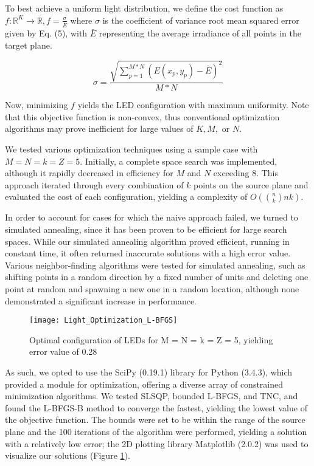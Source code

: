 \documentclass[a4paper]{article}
\begin{document}
To best achieve a uniform light distribution, we define the cost function as $f: \mathbb{R}^K \rightarrow \mathbb{R}, f = \frac{\sigma}{\bar{E}}$ where $\sigma$ is the coefficient of variance root mean squared error given by Eq. (5), with $\bar{E}$ representing the average irradiance of all points in the target plane.  


\begin{equation}
\sigma = \frac{\sqrt{\sum\limits_{p=1}^{M*N}(E(x_p, y_p) - \bar{E})^2}}{M*N}
\end{equation}


Now, minimizing $f$ yields the LED configuration with maximum uniformity. Note that this objective function is non-convex, thus conventional optimization algorithms may prove inefficient for large values of $K, M,$ or $N$.

We tested various optimization techniques using a sample case with $M = N = k = Z = 5$. Initially, a complete space search was implemented, although it rapidly decreased in efficiency for $M$ and $N$ exceeding $8$. This approach iterated through every combination of $k$ points on the source plane and evaluated the cost of each configuration, yielding a complexity of $O({n \choose k}nk)$.

In order to account for cases for which the naive approach failed, we turned to simulated annealing, since it has been proven to be efficient for large search spaces. While our simulated annealing algorithm proved efficient, running in constant time, it often returned inaccurate solutions with a high error value. Various neighbor-finding algorithms were tested for simulated annealing, such as shifting points in a random direction by a fixed number of units and deleting one point at random and spawning a new one in a random location, although none demonstrated a significant increase in performance. 

\begin{figure}[b]
    \centering
    \texttt{[image: Light\_Optimization\_L-BFGS]}
    \caption{Optimal configuration of LEDs for M = N = k = Z = 5, yielding error value of 0.28}
    \label{solution}
\end{figure}

As such, we opted to use the SciPy (0.19.1) library for Python (3.4.3), which provided a module for optimization, offering a diverse array of constrained minimization algorithms. We tested SLSQP, bounded L-BFGS, and TNC, and found the L-BFGS-B method to converge the fastest, yielding the lowest value of the objective function. The bounds were set to be within the range of the source plane and the 100 iterations of the algorithm were performed, yielding a solution with a relatively low error; the 2D plotting library Matplotlib (2.0.2) was used to visualize our solutions (Figure \ref{solution}). 
\end{document}
